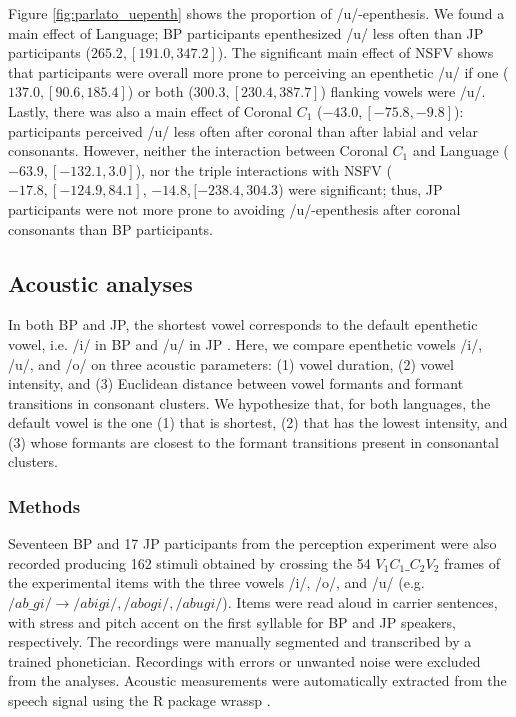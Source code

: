 {\color{blue}Figure \ref{fig:parlato_uepenth} shows the proportion of /u/-epenthesis.} We found a main effect of Language; BP participants epenthesized /u/ less often than JP participants ($265.2, [191.0, 347.2]$). The significant main effect of NSFV shows that participants were overall more prone to perceiving an epenthetic /u/ if one ($137.0, [90.6, 185.4]$) or both ($300.3, [230.4, 387.7]$) flanking vowels were /u/. Lastly, there was also a main effect of Coronal $C_{1}$ ($-43.0, [-75.8, -9.8]$): participants perceived /u/ less often after coronal than after labial and velar consonants. However, neither the interaction between Coronal $C_{1}$ and Language ($-63.9, [-132.1, 3.0]$), nor the triple interactions with NSFV ($-17.8, [-124.9, 84.1]$, $-14.8, [-238.4, 304.3$) were significant; thus, JP participants were not more prone to avoiding /u/-epenthesis after coronal consonants than BP participants. 


\subsection{Acoustic analyses}

In both BP and JP, the shortest vowel corresponds to the default epenthetic vowel, i.e. /i/ in BP \cite{escudero2009} and /u/ in JP \cite{han1962}. Here, we compare epenthetic vowels /i/, /u/, and /o/ on three acoustic parameters: (1) vowel duration, (2) vowel intensity, and (3) Euclidean distance between vowel formants and formant transitions in consonant clusters. We hypothesize that, for both languages, the default vowel is the one (1) that is shortest, (2) that has the lowest intensity, and (3) whose formants are closest to the formant transitions present in consonantal clusters.       

\subsubsection{Methods}

Seventeen BP and 17 JP participants from the perception experiment were also recorded producing 162 stimuli obtained by crossing the 54 $V_{1}C_{1}\_C_{2}V_{2}$ frames of the experimental items with the three vowels /i/, /o/, and /u/ (e.g. $/ab\_gi/ \rightarrow /abigi/, /abogi/, /abugi/$).
Items were read aloud in carrier sentences, with stress and pitch accent on the first syllable for BP and JP speakers, respectively. The recordings were manually segmented and transcribed by a trained phonetician. Recordings with errors or unwanted noise were excluded from the analyses. Acoustic measurements were automatically extracted from the speech signal using the R package wrassp \cite{R-wrassp}.

